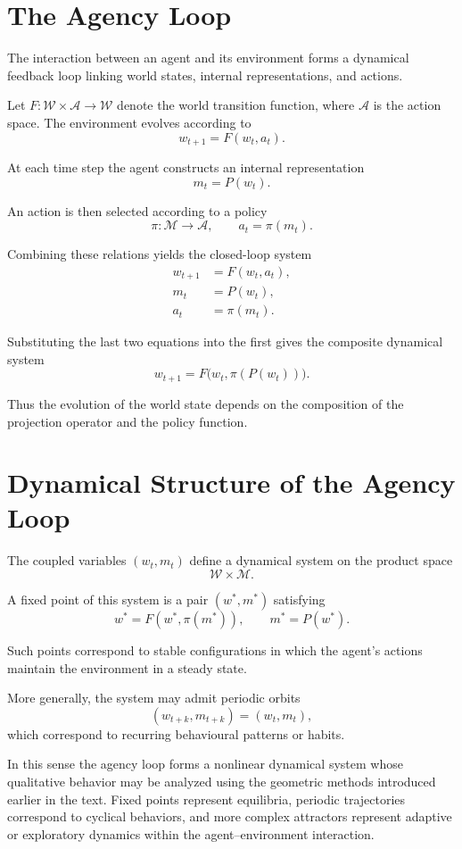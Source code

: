 \documentclass[11pt, openany]{book}
\theoremstyle{plain}
\theoremstyle{definition}
\theoremstyle{remark}
\begin{document}
\section{The Agency Loop}

The interaction between an agent and its environment forms a dynamical
feedback loop linking world states, internal representations, and
actions.

Let $F:\mathcal{W}\times\mathcal{A}\to\mathcal{W}$ denote the world
transition function, where $\mathcal{A}$ is the action space.  The
environment evolves according to
\[
w_{t+1}=F(w_t,a_t).
\]

At each time step the agent constructs an internal representation
\[
m_t=P(w_t).
\]

An action is then selected according to a policy
\[
\pi:\mathcal{M}\to\mathcal{A},
\qquad
a_t=\pi(m_t).
\]

Combining these relations yields the closed-loop system
\[
\begin{aligned}
w_{t+1} &= F(w_t,a_t), \\
m_t &= P(w_t), \\
a_t &= \pi(m_t).
\end{aligned}
\]

Substituting the last two equations into the first gives the composite
dynamical system
\[
w_{t+1}
=
F\bigl(w_t,\pi(P(w_t))\bigr).
\]

Thus the evolution of the world state depends on the composition of the
projection operator and the policy function.

\section{Dynamical Structure of the Agency Loop}

The coupled variables $(w_t,m_t)$ define a dynamical system on the
product space
\[
\mathcal{W}\times\mathcal{M}.
\]

A fixed point of this system is a pair $(w^*,m^*)$ satisfying
\[
w^*=F(w^*,\pi(m^*)),
\qquad
m^*=P(w^*).
\]

Such points correspond to stable configurations in which the agent's
actions maintain the environment in a steady state.

More generally, the system may admit periodic orbits
\[
(w_{t+k},m_{t+k})=(w_t,m_t),
\]
which correspond to recurring behavioural patterns or habits.

In this sense the agency loop forms a nonlinear dynamical system whose
qualitative behavior may be analyzed using the geometric methods
introduced earlier in the text.  Fixed points represent equilibria,
periodic trajectories correspond to cyclical behaviors, and more
complex attractors represent adaptive or exploratory dynamics within the
agent–environment interaction.
\end{document}
